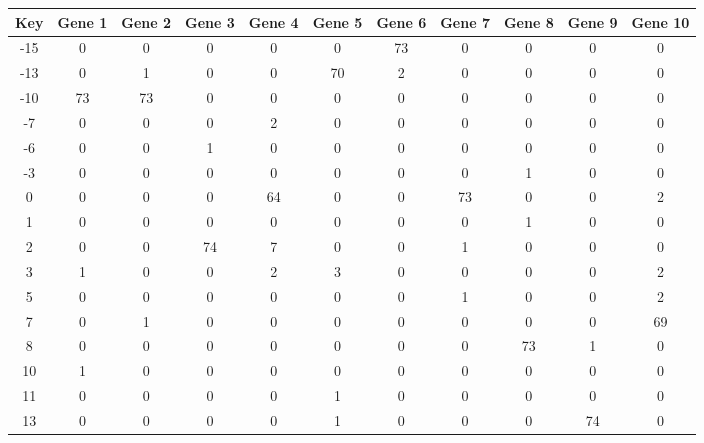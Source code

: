 \begin{tabular}{|c|c|c|c|c|c|c|c|c|c|c|}
\hline
Key & Gene 1 & Gene 2 & Gene 3 & Gene 4 & Gene 5 & Gene 6 & Gene 7 & Gene 8 & Gene 9 & Gene 10 \\
\hline
-15 & 0 & 0 & 0 & 0 & 0 & 73 & 0 & 0 & 0 & 0 \\
-13 & 0 & 1 & 0 & 0 & 70 & 2 & 0 & 0 & 0 & 0 \\
-10 & 73 & 73 & 0 & 0 & 0 & 0 & 0 & 0 & 0 & 0 \\
-7 & 0 & 0 & 0 & 2 & 0 & 0 & 0 & 0 & 0 & 0 \\
-6 & 0 & 0 & 1 & 0 & 0 & 0 & 0 & 0 & 0 & 0 \\
-3 & 0 & 0 & 0 & 0 & 0 & 0 & 0 & 1 & 0 & 0 \\
0 & 0 & 0 & 0 & 64 & 0 & 0 & 73 & 0 & 0 & 2 \\
1 & 0 & 0 & 0 & 0 & 0 & 0 & 0 & 1 & 0 & 0 \\
2 & 0 & 0 & 74 & 7 & 0 & 0 & 1 & 0 & 0 & 0 \\
3 & 1 & 0 & 0 & 2 & 3 & 0 & 0 & 0 & 0 & 2 \\
5 & 0 & 0 & 0 & 0 & 0 & 0 & 1 & 0 & 0 & 2 \\
7 & 0 & 1 & 0 & 0 & 0 & 0 & 0 & 0 & 0 & 69 \\
8 & 0 & 0 & 0 & 0 & 0 & 0 & 0 & 73 & 1 & 0 \\
10 & 1 & 0 & 0 & 0 & 0 & 0 & 0 & 0 & 0 & 0 \\
11 & 0 & 0 & 0 & 0 & 1 & 0 & 0 & 0 & 0 & 0 \\
13 & 0 & 0 & 0 & 0 & 1 & 0 & 0 & 0 & 74 & 0 \\
\hline
\end{tabular}